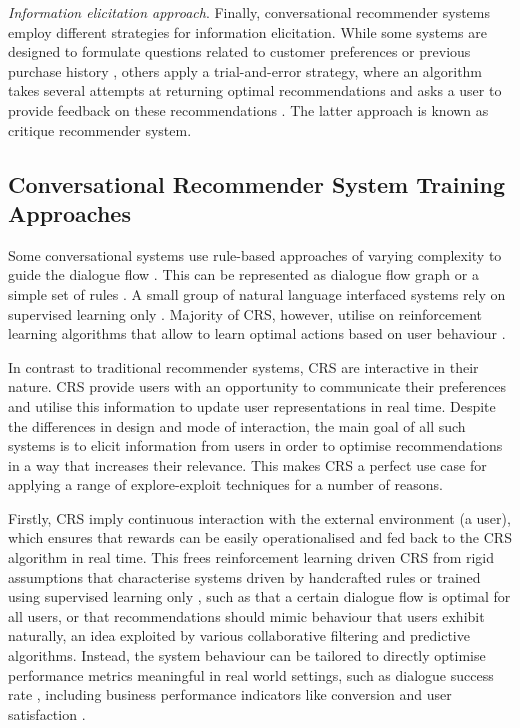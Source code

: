 \textit{Information elicitation approach}. Finally, conversational recommender systems employ different strategies for information elicitation. While some systems are designed to formulate questions related to customer preferences or previous purchase history \citep{sun2018conversational}, others apply a trial-and-error strategy, where an algorithm takes several attempts at returning optimal recommendations and asks a user to provide feedback on these recommendations \citep{li2018towards, mcginty2006adaptive}. The latter approach is known as critique recommender system.


\subsection{Conversational Recommender System Training Approaches}

Some conversational systems use rule-based approaches of varying complexity to guide the dialogue flow \citep{ayundhita2019ontology, dalton2018vote, chandrashekara2018fuzzy}. This can be represented as dialogue flow graph \citep{warnestaal2005modeling} or a simple set of rules \citep{dalton2018vote}. A small group of natural language interfaced systems rely on supervised learning only \citep{li2018towards}. Majority of CRS, however, utilise on reinforcement learning algorithms that allow to learn optimal actions based on user behaviour \citep{sun2018conversational, christakopoulou2016towards}. 

In contrast to traditional recommender systems, CRS are interactive in their nature. CRS provide users with an opportunity to communicate their preferences and utilise this information to update user representations in real time. Despite the differences in design and mode of interaction, the main goal of all such systems is to elicit information from users in order to optimise recommendations in a way that increases their relevance. This makes CRS a perfect use case for applying a range of explore-exploit techniques for a number of reasons. 

Firstly, CRS imply continuous interaction with the external environment (a user), which ensures that rewards can be easily operationalised and fed back to the CRS algorithm in real time. This frees reinforcement learning driven CRS from rigid assumptions that characterise systems driven by handcrafted rules \citep{mahmood2009learning} or trained using supervised learning only \citep{li2018towards}, such as that a certain dialogue flow is optimal for all users, or that recommendations should mimic behaviour that users exhibit naturally, an idea exploited by various collaborative filtering and predictive algorithms. Instead, the system behaviour can be tailored to directly optimise performance metrics meaningful in real world settings, such as dialogue success rate \citep{vendrov2020gradient, lei2020estimation, li2021seamlessly}, including business performance indicators like conversion and user satisfaction \citep{mahmood2009improving, mahmood2009learning}.

